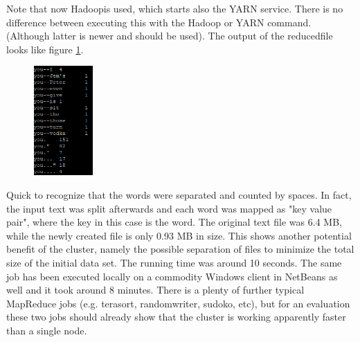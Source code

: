 Note that now \glqq Hadoop\grqq is used, which starts also the YARN service. There is no difference between executing this with the Hadoop or YARN command. (Although latter is newer and should be used). The output of the \glqq reduced\grqq file looks like figure \ref{pic:words}.
\begin{figure}[H]
\hspace{5.2cm}
\includegraphics[width=0.2\textwidth]{img/words}
\label{pic:words}
\end{figure}
\noindent Quick to recognize that the words were separated and counted by spaces. In fact, the input text was split
afterwards and each word was mapped as "key value pair", where the key in this case is the word. The
original text file was 6.4 MB, while the newly created file is only 0.93 MB in size. This shows another
potential benefit of the cluster, namely the possible separation of files to minimize the total size of the initial data set. The running time was around 10 seconds. The same job has been executed locally on a
commodity Windows client in NetBeans as well and it took around 8 minutes. There is a plenty of further typical MapReduce jobs (e.g. terasort, randomwriter, sudoko, etc), but for an evaluation these two jobs should already show that the cluster is working apparently faster than a single node.
